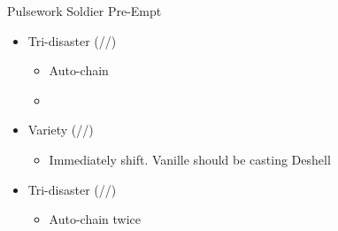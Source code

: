 \documentclass{report}
\begin{document}
\renewcommand{\first}{[1] Tri-disaster (\rav/\rav/\rav)}
\renewcommand{\fourth}{[4] Variety (\rav/\sab/\med)}

\begin{battle}{Pulsework Soldier Pre-Empt}
\begin{itemize}
    \item \first
    \begin{itemize}
        \item Auto-chain
        \item \stagger
    \end{itemize}
    \item \fourth
    \begin{itemize}
        \item Immediately shift. Vanille should be casting Deshell
    \end{itemize}
    \item \first
    \begin{itemize}
        \item Auto-chain twice
    \end{itemize}
\end{itemize}
\end{battle}

\end{document}
